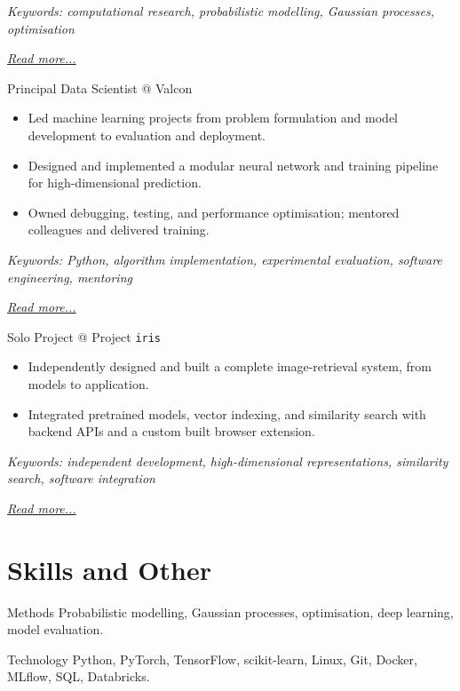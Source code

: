 \documentclass[11pt,a4paper]{moderncv}
\begin{document}
{\footnotesize\textit{Keywords: computational research, probabilistic modelling, Gaussian processes, optimisation}}

\hfill{\small{\textit{\hyperref[sec:raysearch]{Read more...}}}}

\large{Principal Data Scientist @ Valcon}
\normalsize
\begin{itemize}
    \item Led machine learning projects from problem formulation and model development to evaluation and deployment.
    \item Designed and implemented a modular neural network and training pipeline for high-dimensional prediction.
    \item Owned debugging, testing, and performance optimisation; mentored colleagues and delivered training.
\end{itemize}

{\footnotesize\textit{Keywords: Python, algorithm implementation, experimental evaluation, software engineering, mentoring}}

\hfill{\small{\textit{\hyperref[sec:valcon]{Read more...}}}}

\large{Solo Project @ Project \texttt{iris}}
\normalsize
\begin{itemize}
    \item Independently designed and built a complete image-retrieval system, from models to application.
    \item Integrated pretrained models, vector indexing, and similarity search with backend APIs and a custom built browser extension.
\end{itemize}

{\footnotesize\textit{Keywords: independent development, high-dimensional representations, similarity search, software integration}}

\hfill{\small{\textit{\hyperref[sec:iris]{Read more...}}}}

\section{Skills and Other}

\cvitem
{Methods}
{Probabilistic modelling, Gaussian processes, optimisation, deep learning, model evaluation.}

\cvitem
{Technology}
{Python, PyTorch, TensorFlow, scikit-learn, Linux, Git, Docker, MLflow, SQL, Databricks.}
\end{document}
